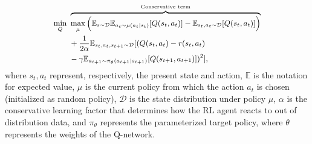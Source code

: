 \begin{equation}
\small
\begin{aligned}
    \min_Q \ & \overbrace{\max_{\mu} \Big(\mathbb{E}_{s\sim \mathcal{D}}\mathbb{E}_{a_t \sim \mu(a_t \vert s_t)}[Q(s_t,a_t)] - \mathbb{E}_{s_t,a_t \sim \mathcal{D}}[Q(s_t,a_t)]\Big)}^{\text{Conservative term}} \\
    & + \frac{1}{2\alpha}\mathbb{E}_{s_t,a_t,s_{t+1} \sim \mathcal{D}}[(Q(s_t,a_t) - r(s_t,a_t) \\& - \gamma \mathbb{E}_{a_{t+1} \sim \pi_{\theta}(a_{t+1} \vert s_{t+1})}[Q(s_{t+1},a_{t+1})])^2],
\end{aligned}
\label{eq:CQL}
\end{equation}
where $s_t,a_t$ represent, respectively, the present state and  action, $\mathbb{E}$ is the notation for expected value, $\mu$ is the current policy from which the action $a_t$ is chosen (initialized as random policy), $\mathcal{D}$ is the state distribution under policy $\mu$, $\alpha$ is the conservative learning factor that determines how the RL agent reacts to out of distribution data, and $\pi_{\theta}$ represents the parameterized target policy, where $\theta$ represents the weights of the Q-network.
\fi 
 

